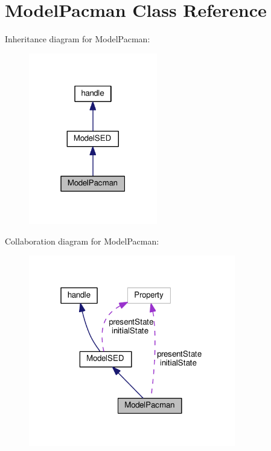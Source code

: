 \hypertarget{class_model_pacman}{}\section{Model\+Pacman Class Reference}
\label{class_model_pacman}


Inheritance diagram for Model\+Pacman\+:\nopagebreak
\begin{figure}[H]
\begin{center}
\leavevmode
\includegraphics[width=159pt]{class_model_pacman__inherit__graph}
\end{center}
\end{figure}


Collaboration diagram for Model\+Pacman\+:\nopagebreak
\begin{figure}[H]
\begin{center}
\leavevmode
\includegraphics[width=256pt]{class_model_pacman__coll__graph}
\end{center}
\end{figure}
